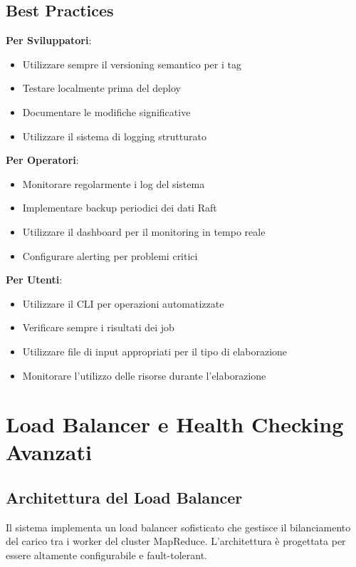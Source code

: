 \documentclass[12pt,a4paper]{article}
\begin{document}
\subsection{Best Practices}

\textbf{Per Sviluppatori}:
\begin{itemize}
\item Utilizzare sempre il versioning semantico per i tag
\item Testare localmente prima del deploy
\item Documentare le modifiche significative
\item Utilizzare il sistema di logging strutturato
\end{itemize}

\textbf{Per Operatori}:
\begin{itemize}
\item Monitorare regolarmente i log del sistema
\item Implementare backup periodici dei dati Raft
\item Utilizzare il dashboard per il monitoring in tempo reale
\item Configurare alerting per problemi critici
\end{itemize}

\textbf{Per Utenti}:
\begin{itemize}
\item Utilizzare il CLI per operazioni automatizzate
\item Verificare sempre i risultati dei job
\item Utilizzare file di input appropriati per il tipo di elaborazione
\item Monitorare l'utilizzo delle risorse durante l'elaborazione
\end{itemize}

\section{Load Balancer e Health Checking Avanzati}

\subsection{Architettura del Load Balancer}

Il sistema implementa un load balancer sofisticato che gestisce il bilanciamento del carico tra i worker del cluster MapReduce. L'architettura è progettata per essere altamente configurabile e fault-tolerant.
\end{document}
